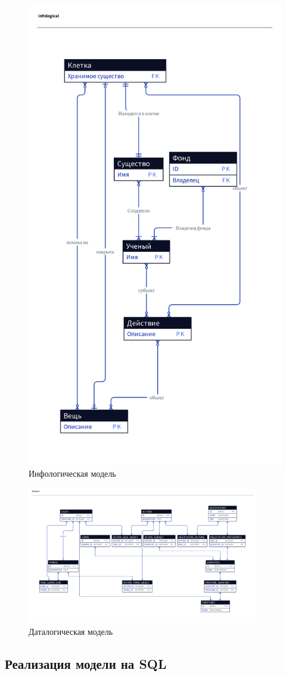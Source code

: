 % 
\begin{figure}[ht]
  \centering
  \includegraphics[height=0.9\textheight]{./img/infological.pdf}
  \caption{Инфологическая модель}
\end{figure}


\clearpage
\begin{figure}[ht]
  \centering
  \includegraphics[width=0.9\textwidth]{./img/datalogical.pdf}
  \caption{Даталогическая модель}
\end{figure}

\subsection{Реализация модели на SQL}

\inputminted[breaklines]{SQL}{../scheme.sql}
